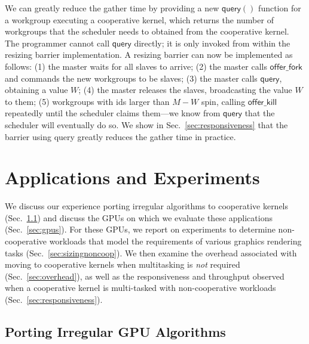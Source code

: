 \documentclass[numbers,nocopyrightspace,10pt]{sigplanconf}
\newcommand{\mysec}{Sec.~}
\newcommand{\offerfork}{\mathsf{offer\_fork}}
\newcommand{\offerkill}{\mathsf{offer\_kill}}
\newcommand{\keyword}[1]{\mathsf{#1}}
\begin{document}
We can greatly reduce the gather time by providing a new $\keyword{query}()$
function for a workgroup executing a cooperative kernel, which returns the number of workgroups that the scheduler needs to obtained
from the cooperative kernel.  
%
The programmer cannot call $\keyword{query}$ directly;
it is only invoked from within the resizing barrier implementation.
%
A resizing barrier can now be implemented
as follows: (1) the master waits for all slaves to arrive; (2) the master calls $\offerfork$ and
commands the new workgroups to be slaves; (3) the master calls $\keyword{query}$, obtaining a value $W$;
(4) the master releases the slaves, broadcasting the value $W$ to them; (5) workgroups with ids larger than $M-W$ spin, calling 
$\offerkill$ repeatedly until the scheduler claims them---we know from $\keyword{query}$ that the scheduler will eventually do so.
We show in \mysec\ref{sec:responsiveness} that the barrier using
query greatly reduces the gather time in practice.


\section{Applications and Experiments}\label{sec:experiments}

We discuss our experience porting irregular algorithms to cooperative kernels (\mysec\ref{sec:portingalgorithms}) and discuss the GPUs on which we evaluate these applications (\mysec\ref{sec:gpus}).  For these GPUs, we report on experiments to determine non-cooperative workloads that model the requirements of various graphics rendering tasks (\mysec\ref{sec:sizingnoncoop}).  We then examine the overhead associated with moving to cooperative kernels when multitasking is \emph{not} required (\mysec\ref{sec:overhead}), as well as the responsiveness and throughput observed when a cooperative kernel is multi-tasked with non-cooperative workloads (\mysec\ref{sec:responsiveness}).

\subsection{Porting Irregular GPU Algorithms}\label{sec:portingalgorithms}
\end{document}
